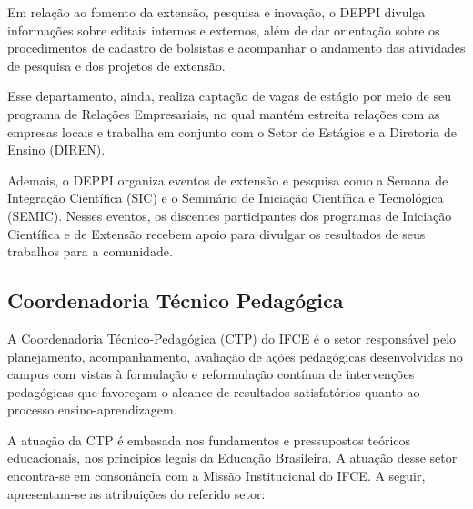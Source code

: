 Em relação ao fomento da extensão, pesquisa e inovação, o DEPPI divulga informações sobre editais internos e externos, além de dar orientação sobre os procedimentos de cadastro de bolsistas e acompanhar o andamento das atividades de pesquisa e dos projetos de extensão. 

Esse departamento, ainda, realiza captação de vagas de estágio por meio de seu programa de Relações Empresariais, no qual mantém estreita relações com as empresas locais e trabalha em conjunto com o Setor de Estágios e a Diretoria de Ensino (DIREN). 

Ademais, o DEPPI organiza eventos de extensão e pesquisa como a Semana de Integração Científica (SIC) e o Seminário de Iniciação Científica e Tecnológica (SEMIC). Nesses eventos, os discentes participantes dos programas de Iniciação Científica e de Extensão recebem apoio para divulgar os resultados de seus trabalhos para a comunidade.

\subsection{Coordenadoria Técnico Pedagógica}

A Coordenadoria Técnico-Pedagógica (CTP) do IFCE é o setor responsável pelo planejamento, acompanhamento, avaliação de ações pedagógicas desenvolvidas no campus com vistas à formulação e reformulação contínua de intervenções pedagógicas que favoreçam o alcance de resultados satisfatórios quanto ao processo ensino-aprendizagem.

A atuação da CTP é embasada nos fundamentos e pressupostos teóricos educacionais, nos princípios legais da Educação Brasileira. A atuação desse setor encontra-se em consonância com a Missão Institucional do IFCE. A seguir, apresentam-se as atribuições do referido setor:


